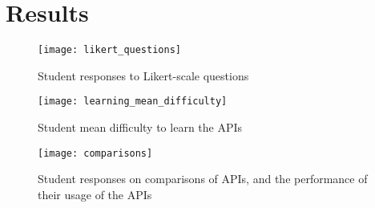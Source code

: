 \section{Results}
\label{sec:results}

\begin{figure}[htpb]
    \centering
    \texttt{[image: likert\_questions]}
    \caption{Student responses to Likert-scale questions}
    \label{fig:}
\end{figure}

\begin{figure}[htpb]
    \centering
    \texttt{[image: learning\_mean\_difficulty]}
    \caption{Student mean difficulty to learn the APIs}
    \label{fig:}
\end{figure}

\begin{figure}[htpb]
    \centering
    \texttt{[image: comparisons]}
    \caption{Student responses on comparisons of APIs, and the performance of their usage of the APIs}
    \label{fig:}
\end{figure}

